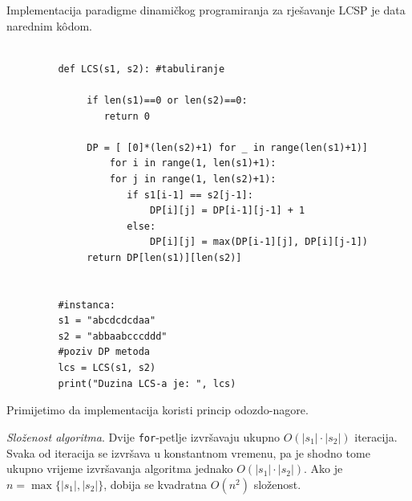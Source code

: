 	    
	 Implementacija paradigme dinamičkog programiranja za rješavanje LCSP je data narednim k\^odom. 
 \begin{verbatim}
	    	
	     def LCS(s1, s2): #tabuliranje
	    	      
	    	  if len(s1)==0 or len(s2)==0:
	    	     return 0
	    	     
	    	  DP = [ [0]*(len(s2)+1) for _ in range(len(s1)+1)]
	              for i in range(1, len(s1)+1):
	    	      for j in range(1, len(s2)+1):
	    		     if s1[i-1] == s2[j-1]: 
	    		         DP[i][j] = DP[i-1][j-1] + 1
	    		     else:
	    		         DP[i][j] = max(DP[i-1][j], DP[i][j-1])
	    	  return DP[len(s1)][len(s2)]        
	    		           
	    	      
	     #instanca:
	     s1 = "abcdcdcdaa"
	     s2 = "abbaabcccddd"
	     #poziv DP metoda
	     lcs = LCS(s1, s2)
	     print("Duzina LCS-a je: ", lcs)     
 \end{verbatim}
	     Primijetimo da implementacija koristi princip odozdo-nagore.
	     
	     \textit{Složenost algoritma}. Dvije \texttt{for}-petlje  izvršavaju ukupno $O(|s_1|\cdot |s_2|)$ iteracija. Svaka od iteracija se izvršava u konstantnom vremenu, pa je shodno tome ukupno vrijeme izvršavanja algoritma jednako $O(|s_1| \cdot |s_2|)$. Ako je $n = \max\{|s_1|, |s_2|\}$, dobija se kvadratna $O(n^2)$ složenost. 
	     
     
